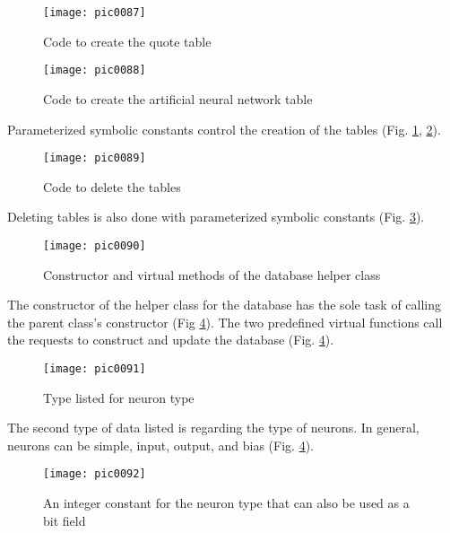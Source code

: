 \begin{figure}[h]
\centering
\texttt{[image: pic0087]}
\caption{Code to create the quote table}
\label{fig:pic0087}
\end{figure}
\FloatBarrier

\begin{figure}[h]
\centering
\texttt{[image: pic0088]}
\caption{Code to create the artificial neural network table}
\label{fig:pic0088}
\end{figure}
\FloatBarrier

Parameterized symbolic constants control the creation of the tables (Fig. \ref{fig:pic0087}, \ref{fig:pic0088}).

\begin{figure}[h]
\centering
\texttt{[image: pic0089]}
\caption{Code to delete the tables}
\label{fig:pic0089}
\end{figure}
\FloatBarrier

Deleting tables is also done with parameterized symbolic constants (Fig. \ref{fig:pic0089}).

\begin{figure}[h]
\centering
\texttt{[image: pic0090]}
\caption{Constructor and virtual methods of the database helper class}
\label{fig:pic0090}
\end{figure}
\FloatBarrier

The constructor of the helper class for the database has the sole task of calling the parent class's constructor (Fig \ref{fig:pic0090}). The two predefined virtual functions call the requests to construct and update the database (Fig. \ref{fig:pic0090}).

\begin{figure}[h]
\centering
\texttt{[image: pic0091]}
\caption{Type listed for neuron type}
\label{fig:pic0091}
\end{figure}
\FloatBarrier

The second type of data listed is regarding the type of neurons. In general, neurons can be simple, input, output, and bias (Fig. \ref{fig:pic0090}).

\begin{figure}[h]
\centering
\texttt{[image: pic0092]}
\caption{An integer constant for the neuron type that can also be used as a bit field}
\label{fig:pic0092}
\end{figure}
\FloatBarrier


